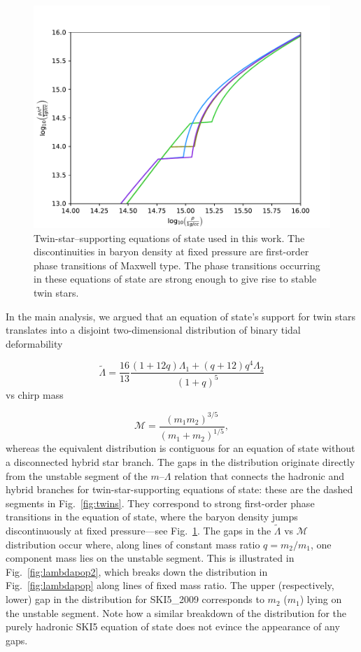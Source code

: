 \documentclass[aps,prd,twocolumn,superscriptaddress,nofootinbib]{revtex4-1}
\begin{document}
\begin{figure}[b]
    \centering
    \includegraphics[width=0.95\columnwidth,trim={0 0 30 30},clip]{EoS.pdf}
    \caption{Twin-star--supporting equations of state used in this work. The discontinuities in baryon density at fixed pressure are first-order phase transitions of Maxwell type. The phase transitions occurring in these equations of state are strong enough to give rise to stable twin stars.}
    \label{fig:Eos_plot}
\end{figure}

In the main analysis, we argued that an equation of state's support for twin stars translates into a disjoint two-dimensional distribution of binary tidal deformability

\begin{equation}
    \tilde{\Lambda} = \frac{16}{13} \frac{(1+12q) \Lambda_1 + (q+12)q^4\Lambda_2}{(1+q)^5}
\end{equation}
vs chirp mass

\begin{equation}
    \mathcal{M} = \frac{(m_1 m_2)^{3/5}}{(m_1+m_2)^{1/5}} ,
\end{equation}
whereas the equivalent distribution is contiguous for an equation of state without a disconnected hybrid star branch.
The gaps in the distribution originate directly from the unstable segment of the $m$--$\Lambda$ relation that connects the hadronic and hybrid branches for twin-star-supporting equations of state: these are the dashed segments in Fig.~\ref{fig:twins}.
They correspond to strong first-order phase transitions in the equation of state, where the baryon density jumps discontinuously at fixed pressure---see Fig.~\ref{fig:Eos_plot}.
The gaps in the $\tilde{\Lambda}$ vs $\mathcal{M}$ distribution occur where, along lines of constant mass ratio $q = m_2/m_1$, one component mass lies on the unstable segment.
This is illustrated in Fig.~\ref{fig:lambdapop2}, which breaks down the distribution in Fig.~\ref{fig:lambdapop} along lines of fixed mass ratio.
The upper (respectively, lower) gap in the distribution for SKI5\_2009 corresponds to $m_2$ ($m_1$) lying on the unstable segment. Note how a similar breakdown of the distribution for the purely hadronic SKI5 equation of state does not evince the appearance of any gaps.
\end{document}
